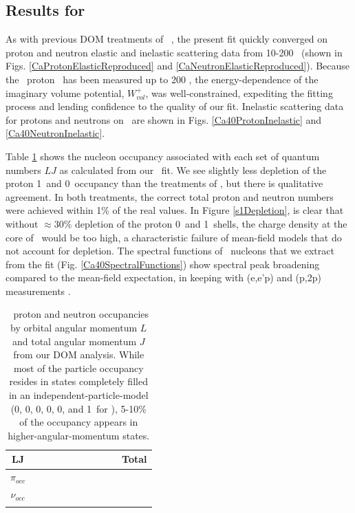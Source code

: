 \subsection{Results for \caForty}
As with previous DOM treatments of \caForty\ \cite{MahzoonPhDThesis}, the present fit
quickly converged on proton and neutron elastic and inelastic scattering data from 10-200
\mega\electronvolt\ (shown in Figs. \ref{CaProtonElasticReproduced} and
\ref{CaNeutronElasticReproduced}). Because the \caForty\ proton \rxn\ 
has been
measured up to 200 \mega\electronvolt, the energy-dependence of the imaginary volume potential, 
$W_{vol}^{+}$, was well-constrained, expediting the fitting process
and lending confidence to the quality of our fit. Inelastic scattering data for
protons and neutrons on \caForty\ are shown in Figs. \ref{Ca40ProtonInelastic}
and \ref{Ca40NeutronInelastic}. 

Table \ref{Ca40ParticleNumber} shows the nucleon occupancy associated with each
set of quantum numbers $LJ$ as calculated from our \caForty\ fit. We see
slightly less depletion of the proton 1\sOne\ and 0\dThree\ occupancy than the
treatments of \cite{MahzoonPhDThesis, Mahzoon2017}, but there is qualitative
agreement. In both treatments, the correct total proton and neutron numbers were
achieved within 1\% of the real values. In Figure \ref{s1Depletion}, is clear
that without $\approx$30\%
depletion of the proton 0\sOne\ and 1\sOne\ shells, the charge density at the core of
\caForty\ would be too high,
a characteristic failure of mean-field models that do not account for depletion. 
The spectral functions of \caForty\ nucleons that 
we extract from the fit (Fig. \ref{Ca40SpectralFunctions})
show spectral peak broadening compared 
to the mean-field expectation, in keeping with (e,e'p) and (p,2p) measurements
\cite{Jacob1966, Jacob1973}.

\begin{table}[tb]
    \caption[\caForty\ proton and neutron occupancies from our DOM analysis]
    {
        \caForty\ proton and neutron occupancies by orbital angular momentum
        $L$ and total angular momentum $J$ from our DOM analysis. While
        most of the particle occupancy resides in states completely
        filled in an independent-particle-model (0\sOne, 0\pThree, 0\pOne, 0\dFive, 0\dThree,
        and 1\sOne\ for \caForty), 5-10\% of the occupancy appears in
        higher-angular-momentum states.
    }
    \centering
    \begin{tabular}{c c c c c c c c c c c}
        \toprule
        LJ & \sOne & \pThree & \pOne & \dFive & \dThree & \fSeven & \fFive &
        \gNine & \gSeven & Total\\
        \midrule
        $\pi_{occ}$ & & & & & & & & & & \\
        $\nu_{occ}$ & & & & & & & & & & \\
        \bottomrule
        \label{Ca40ParticleNumber}
    \end{tabular}
\end{table}

